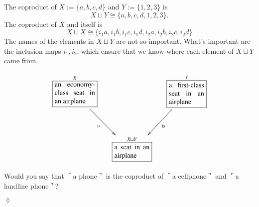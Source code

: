 \documentclass{book}
\def\tn{\textnormal}
\def\iso{\cong}
\newcommand{\LA}[2]{\ar[#1]^-{\tn {#2}}}
\newcommand{\LAL}[2]{\ar[#1]_-{\tn {#2}}}
\newcommand{\obox}[3]{\stackrel{#1}{\fbox{\parbox{#2}{#3}}}}
\newcommand{\fakebox}[1]{\tn{$\ulcorner$#1$\urcorner$}}
\theoremstyle{theoremENG}
\theoremstyle{lemmaENG}
\theoremstyle{propositionENG}
\theoremstyle{corollaryENG}
\theoremstyle{factENG}
\theoremstyle{remarkENG}
\theoremstyle{exampleENG}
\newtheorem{exampleENG}[subsubsection]{\begin{english}Example\end{english}}
\theoremstyle{warningENG}
\theoremstyle{questionENG}
\theoremstyle{guessENG}
\theoremstyle{answerENG}
\theoremstyle{constructionENG}
\theoremstyle{rulesENG}
\theoremstyle{excENG}
\newtheorem{excENG}[subsubsection]{\begin{english}Exercise\end{english}}
\theoremstyle{appENG}
\theoremstyle{definitionENG}
\newtheorem{definitionENG}[subsubsection]{\begin{english}Definition\end{english}}
\theoremstyle{notationENG}
\theoremstyle{conjectureENG}
\theoremstyle{postulateENG}
\newenvironment{exerciseENG}{\begin{excENG}}{\hspace*{\fill}$\lozenge$\end{excENG}}
\theoremstyle{theoremRUS}
\theoremstyle{lemmaRUS}
\theoremstyle{propositionRUS}
\theoremstyle{corollaryRUS}
\theoremstyle{factRUS}
\theoremstyle{remarkRUS}
\theoremstyle{exampleRUS}
\theoremstyle{warningRUS}
\theoremstyle{questionRUS}
\theoremstyle{guessRUS}
\theoremstyle{answerRUS}
\theoremstyle{constructionRUS}
\theoremstyle{rulesRUS}
\theoremstyle{excRUS}
\theoremstyle{appRUS}
\theoremstyle{definitionRUS}
\theoremstyle{notationRUS}
\theoremstyle{conjectureRUS}
\theoremstyle{postulateRUS}
\begin{document}
\begin{english}
\begin{definitionENG}
\begin{russian} \end{russian}

\end{definitionENG}

\begin{exampleENG}\label{ex:coproduct}

The coproduct of $X:=\{a,b,c,d\}$ and $Y:=\{1,2,3\}$ is $$X\sqcup Y\iso\{a,b,c,d,1,2,3\}.$$ The coproduct of $X$ and itself is $$X\sqcup X\iso\{i_1a,i_1b,i_1c,i_1d,i_2a,i_2b,i_2c,i_2d\}$$ 
The names of the elements in $X\sqcup Y$ are not so important. What's important are the inclusion maps $i_1,i_2$, which ensure that we know where each element of $X\sqcup Y$ came from.

\begin{russian} \end{russian}

\end{exampleENG}

\begin{exampleENG}\label{ex:airplanes}

\begin{align}\label{dia:airplane}
\xymatrix@=15pt{
\obox{X}{.8in}{an economy-class seat in an airplane}\LAL{ddr}{is}&&\obox{Y}{.7in}{a first-class seat in an airplane}\LA{ddl}{is}\\\\
&\obox{X\sqcup Y}{.7in}{a seat in an airplane}
}
\end{align}

\begin{russian} \end{russian}

\end{exampleENG}

\begin{exerciseENG}

Would you say that \fakebox{a phone} is the coproduct of \fakebox{a cellphone} and \fakebox{a landline phone}? 

\begin{russian} \end{russian}

\end{exerciseENG}

\begin{exampleENG}\label{ex:coprod of dots}


\end{exampleENG}
\end{english}
\end{document}
